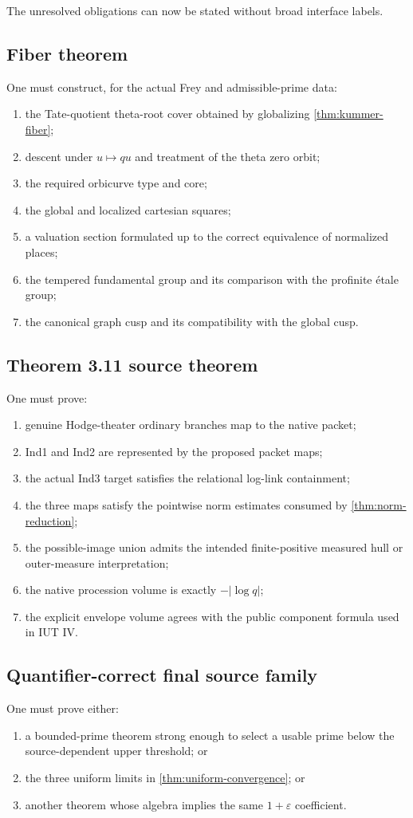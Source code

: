 \documentclass[11pt]{amsart}
\theoremstyle{definition}
\theoremstyle{remark}
\newcommand{\eps}{\varepsilon}
\begin{document}
The unresolved obligations can now be stated without broad interface labels.

\subsection{Fiber theorem}
One must construct, for the actual Frey and admissible-prime data:
\begin{enumerate}[label=(F\arabic*)]
\item the Tate-quotient theta-root cover obtained by globalizing
\cref{thm:kummer-fiber};
\item descent under $u\mapsto qu$ and treatment of the theta zero orbit;
\item the required orbicurve type and core;
\item the global and localized cartesian squares;
\item a valuation section formulated up to the correct equivalence of
normalized places;
\item the tempered fundamental group and its comparison with the profinite
\'etale group;
\item the canonical graph cusp and its compatibility with the global cusp.
\end{enumerate}

\subsection{Theorem 3.11 source theorem}
One must prove:
\begin{enumerate}[label=(S\arabic*)]
\item genuine Hodge-theater ordinary branches map to the native packet;
\item Ind1 and Ind2 are represented by the proposed packet maps;
\item the actual Ind3 target satisfies the relational log-link containment;
\item the three maps satisfy the pointwise norm estimates consumed by
\cref{thm:norm-reduction};
\item the possible-image union admits the intended finite-positive measured
hull or outer-measure interpretation;
\item the native procession volume is exactly $-|\log q|$;
\item the explicit envelope volume agrees with the public component formula
used in IUT IV.
\end{enumerate}

\subsection{Quantifier-correct final source family}
One must prove either:
\begin{enumerate}[label=(Q\arabic*)]
\item a bounded-prime theorem strong enough to select a usable prime below the
source-dependent upper threshold; or
\item the three uniform limits in \cref{thm:uniform-convergence}; or
\item another theorem whose algebra implies the same $1+\eps$ coefficient.
\end{enumerate}
\end{document}

